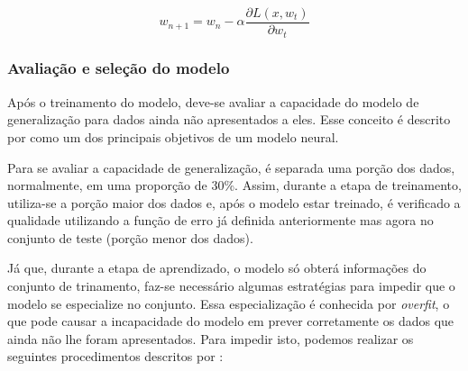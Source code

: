 \documentclass[
    12pt,
    oneside,
    a4paper,
    english,
    brazil
]{abntex2}
\begin{document}
\begin{equation}\label{eq:backpropagation}
    w_{n+1} = w_n - \alpha \frac{\partial L(x,w_t)}{\partial w_t}
\end{equation}

\subsubsection{Avaliação e seleção do modelo}

Após  o treinamento  do  modelo,  deve-se avaliar  a  capacidade  do modelo  de
generalização  para  dados ainda  não  apresentados  a  eles. Esse  conceito  é
descrito por   como  um dos  principais objetivos  de um
modelo neural.

Para se avaliar a capacidade de generalização, é separada uma porção dos dados,
normalmente, em uma  proporção de 30\%. Assim, durante a  etapa de treinamento,
utiliza-se  a  porção maior  dos  dados  e, após  o  modelo  estar treinado,  é
verificado a  qualidade utilizando a  função de erro já  definida anteriormente
mas agora no conjunto de teste (porção menor dos dados).

Já  que, durante  a  etapa  de  aprendizado, o  modelo  só  obterá  informações
do  conjunto  de   trinamento,  faz-se  necessário   algumas  estratégias  para
impedir  que  o  modelo  se  especialize no  conjunto.  Essa  especialização  é
conhecida por \textit{overfit}, o que pode  causar a incapacidade do  modelo em
prever  corretamente  os  dados  que  ainda não  lhe foram  apresentados.  Para
impedir  isto, podemos  realizar   os  seguintes  procedimentos  descritos  por
:
\end{document}
